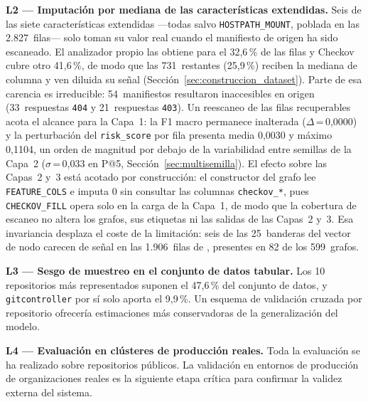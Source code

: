 \textbf{L2 — Imputación por mediana de las características extendidas.} Seis de
las siete características extendidas —todas salvo \texttt{HOSTPATH\_MOUNT},
poblada en las 2.827~filas— solo toman su valor real cuando el manifiesto de
origen ha sido escaneado. El analizador propio las obtiene para el 32,6\,\% de las
filas y Checkov cubre otro 41,6\,\%, de modo que las 731~restantes
(25,9\,\%) reciben la mediana de columna y ven diluida su señal
(Sección~\ref{sec:construccion_dataset}). Parte de esa carencia es irreducible:
54~manifiestos resultaron inaccesibles en origen (33~respuestas \texttt{404} y
21~respuestas \texttt{403}). Un reescaneo de las filas recuperables acota el
alcance para la Capa~1: la F1 macro permanece inalterada
(\(\Delta\)\,=\,0,0000) y la perturbación del \texttt{risk\_score} por fila
presenta media 0,0030 y máximo 0,1104, un orden de magnitud por debajo de la
variabilidad entre semillas de la Capa~2 (\(\sigma\)\,=\,0,033 en P@5,
Sección~\ref{sec:multisemilla}). El efecto sobre las Capas~2 y~3 está acotado por
construcción: el constructor del grafo lee \texttt{FEATURE\_COLS} e imputa 0 sin
consultar las columnas \texttt{checkov\_*}, pues \texttt{CHECKOV\_FILL} opera solo
en la carga de la Capa~1, de modo que la cobertura de escaneo no altera los
grafos, sus etiquetas ni las salidas de las Capas~2 y~3. Esa invariancia desplaza
el coste de la limitación: seis de las 25~banderas del vector de nodo carecen de
señal en las 1.906~filas de \citet{Rahman2022}, presentes en 82 de los 599~grafos.

\textbf{L3 — Sesgo de muestreo en el conjunto de datos tabular.} Los 10 repositorios más
representados suponen el 47,6\,\% del conjunto de datos, y \texttt{gitcontroller} por sí solo
aporta el 9,9\,\%. Un esquema de validación cruzada por repositorio ofrecería
estimaciones más conservadoras de la generalización del modelo.

\textbf{L4 — Evaluación en clústeres de producción reales.} Toda la evaluación
se ha realizado sobre repositorios públicos. La validación en entornos de producción
de organizaciones reales es la siguiente etapa crítica para confirmar la validez
externa del sistema.

